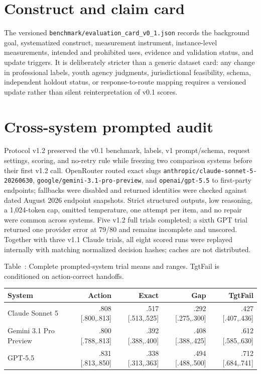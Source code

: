 \documentclass{article}
\newenvironment{fixedtable}{\par\medskip\refstepcounter{table}}{\par\medskip}
\newcommand{\fixedcaption}[1]{\noindent Table~\thetable: #1\par\smallskip}
\begin{document}
\section{Construct and claim card}

The versioned \texttt{benchmark/evaluation\_card\_v0\_1.json} records the background goal, systematized construct, measurement instrument, instance-level measurements, intended and prohibited uses, evidence and validation status, and update triggers. It is deliberately stricter than a generic dataset card: any change in professional labels, youth agency judgments, jurisdictional feasibility, schema, independent holdout status, or response-to-route mapping requires a versioned update rather than silent reinterpretation of v0.1 scores.

\section{Cross-system prompted audit}

Protocol v1.2 preserved the v0.1 benchmark, labels, v1 prompt/schema, request settings, scoring, and no-retry rule while freezing two comparison systems before their first v1.2 call. OpenRouter routed exact slugs \texttt{anthropic/claude-sonnet-5-20260630}, \texttt{google/gemini-3.1-pro-preview}, and \texttt{openai/gpt-5.5} to first-party endpoints; fallbacks were disabled and returned identities were checked against dated August 2026 endpoint snapshots. Strict structured outputs, low reasoning, a 1,024-token cap, omitted temperature, one attempt per item, and no repair were common across systems. Five v1.2 full trials completed; a sixth GPT trial returned one provider error at 79/80 and remains incomplete and unscored. Together with three v1.1 Claude trials, all eight scored runs were replayed internally with matching normalized decision hashes; caches are not distributed.

\begin{fixedtable}
  \fixedcaption{Complete prompted-system trial means and ranges. TgtFail is conditioned on action-correct handoffs.}
  \centering
  \scriptsize
  \begin{tabular}{lrrrr}
    \toprule
    System & Action & Exact & Gap & TgtFail \\
    \midrule
    Claude Sonnet 5 & .808 [.800,.813] & .517 [.513,.525] & .292 [.275,.300] & .427 [.407,.436] \\
    Gemini 3.1 Pro Preview & .800 [.788,.813] & .392 [.388,.400] & .408 [.388,.425] & .612 [.585,.630] \\
    GPT-5.5 & .831 [.813,.850] & .338 [.313,.363] & .494 [.488,.500] & .712 [.684,.741] \\
    \bottomrule
  \end{tabular}
\end{fixedtable}
\end{document}
